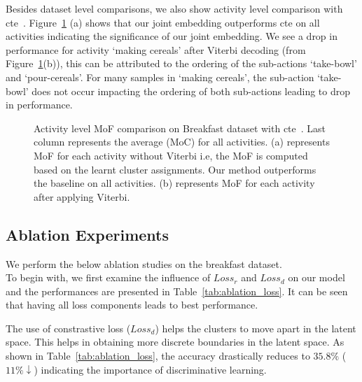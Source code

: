 \documentclass[final]{cvpr}
\begin{document}
Besides dataset level comparisons, we also show activity level comparison with {\sc cte}~\cite{kukleva2019unsupervised}. Figure~\ref{fig:acc_bf} (a) shows that our joint embedding outperforms {\sc cte} on all activities indicating the significance of our joint embedding. 
We see a drop in performance for activity `making cereals' after Viterbi decoding (from Figure~\ref{fig:acc_bf}(b)), this can be attributed to the ordering of the sub-actions `take-bowl' and `pour-cereals'. For many samples in `making cereals', the sub-action `take-bowl' does not occur impacting the ordering of both sub-actions leading to drop in performance.

\begin{figure}[t]
\centering
\hfil
\caption{{\small Activity level MoF comparison on Breakfast dataset with {\sc cte}~\cite{kukleva2019unsupervised}. Last column represents the average (MoC) for all activities. (a) represents MoF for each activity without Viterbi i.e, the MoF is computed based on the learnt cluster assignments. Our method outperforms the baseline on all activities. (b) represents MoF for each activity after applying Viterbi.
}}%
\vspace{-0.3cm}
\label{fig:acc_bf}
\end{figure}


\subsection{Ablation Experiments}
\label{sec:ablation_exp}
\par We perform the below ablation studies on the breakfast dataset. \\
 To begin with, we first examine the influence of $Loss_{r}$ and $Loss_{d}$ on our model and the performances are presented in Table~\ref{tab:ablation_loss}. It can be seen that having all loss components leads to best performance. %

 The use of constrastive loss ($Loss_{d}$) helps the clusters to move apart in the latent space. This helps in obtaining more discrete boundaries in the latent space. As shown in Table~\ref{tab:ablation_loss}, the accuracy drastically reduces to $35.8\%$ ($11\% \downarrow$) indicating the importance of discriminative learning.
\end{document}
